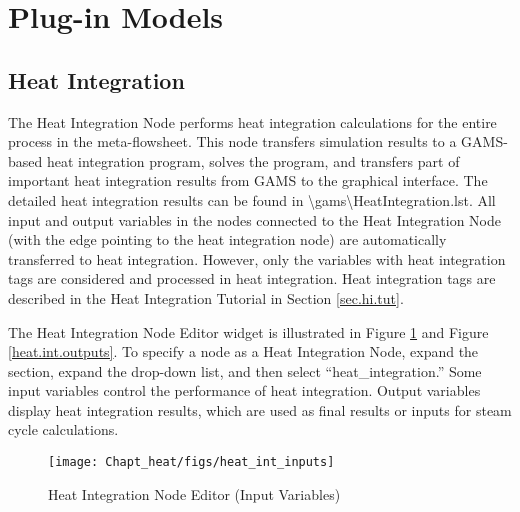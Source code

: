 \section{Plug-in Models}
\label{section.plugin}

\subsection{Heat Integration}

The Heat Integration Node performs heat integration calculations for the entire process in the meta-flowsheet. This node transfers simulation results to a GAMS-based heat integration program, solves the program, and transfers part of important heat integration results from GAMS to the graphical interface. The detailed heat integration results can be found in \textbackslash gams\textbackslash HeatIntegration.lst. All input and output variables in the nodes connected to the Heat Integration Node (with the edge pointing to the heat integration node) are automatically transferred to heat integration. However, only the variables with heat integration tags are considered and processed in heat integration. Heat integration tags are described in the Heat Integration Tutorial in Section \ref{sec.hi.tut}.

The Heat Integration Node Editor widget is illustrated in Figure \ref{heat.int.inputs} and Figure \ref{heat.int.outputs}. To specify a node as a Heat Integration Node, expand the  section, expand the  drop-down list, and then select ``heat\_integration.'' Some input variables control the performance of heat integration. Output variables display heat integration results, which are used as final results or inputs for steam cycle calculations.

\begin{figure}[H]
	\begin{center}
		\texttt{[image: Chapt\_heat/figs/heat\_int\_inputs]}
		\caption{Heat Integration Node Editor (Input Variables)}
		\label{heat.int.inputs}
	\end{center}
\end{figure}
\clearpage

